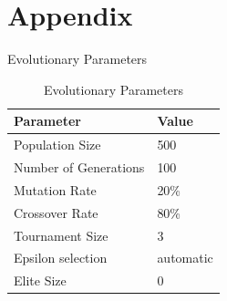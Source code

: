 \documentclass[
  ignorenonframetext,
]{beamer}
\begin{document}
\hypertarget{appendix}{%
\section{Appendix}\label{appendix}}

\begin{frame}{Evolutionary Parameters}
\protect\hypertarget{evolutionary-parameters}{}
\begin{table}

\caption{\label{tab:ea_config}Evolutionary Parameters}
\centering
\begin{tabular}[t]{l|l}
\hline
Parameter & Value\\
\hline
Population Size & 500\\
\hline
Number of Generations & 100\\
\hline
Mutation Rate & 20\%\\
\hline
Crossover Rate & 80\%\\
\hline
Tournament Size & 3\\
\hline
Epsilon selection & automatic\\
\hline
Elite Size & 0\\
\hline
\end{tabular}
\end{table}
\end{frame}
\end{document}
